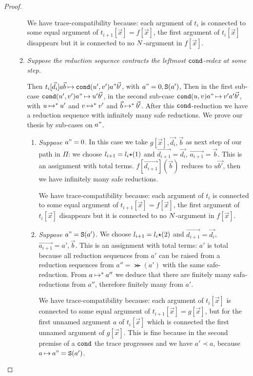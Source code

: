 \begin{proof}
\begin{enumerate}
\begin{enumerate}
  We have trace-compatibility because: 
  each argument of $t_i$ is connected to some equal argument of $t_{i+1}[\vec{x}]=f[\vec{x}]$,
  the first argument of $t_i[\vec{x}]$ disappears but it is connected to no ${N}$-argument in $f[\vec{x}]$.

\item
  \emph{Suppose the reduction sequence contracts the leftmost ${\tt cond}$-redex at some step.}

  Then $t_i[\vec{d_i}]a \vec{b} \mathbin{\mapsto} {\tt cond}(u',v')a"\vec{b'}$, with $a"=0, {\tt S}(a')$,
  Then  in the first sub-case ${\tt cond}(u',v')a" \mathbin{\mapsto} u' \vec{b'}$, in the second sub-case
  ${\tt cond}(u,v)a" \mathbin{\mapsto} v' a' \vec{b'}$, 
  with $u \mathbin{\mapsto}^* u'$ and $v \mathbin{\mapsto}^* v'$ and $\vec{b} \mathbin{\mapsto}^* \vec{b'}$.
  After this ${\tt cond}$-reduction we have a reduction sequence with infinitely many safe reductions.
  We prove our thesis by sub-cases on $a"$.
   

\begin{enumerate}
\item
  \emph{Suppose $a" = 0$}.
   In this case we take $g[\vec{x}],\vec{d_i},\vec{b}$ as next step of our path in $\Pi$:
  we choose $l_{i+1} = l_i {\star} (1)$ and $\vec{d_{i+1}} = \vec{d_i}$,
  $\vec{a_{i+1}} = \vec{b}$. This is an assignment with total terms.
  $f[\vec{d_{i+1}}](\vec{b})$ reduces to $u \vec{b'}$, then we have infinitely many safe reductions.

  We have trace-compatibility because: 
    each argument of $t_i$ is connected to some equal argument of $t_{i+1}[\vec{x}]=f[\vec{x}]$,
    the first argument of $t_i[\vec{x}]$ disappears but it is connected to no ${N}$-argument in $f[\vec{x}]$.

 \item
  \emph{Suppose $a" = {\tt S}(a')$}. 
  We choose $l_{i+1} = l_i {\star} (2)$ and $\vec{d_{i+1}} = \vec{d_i}$,
  $\vec{a_{i+1}} = a',\vec{b}$. This is an assignment with total terms: $a'$ is total because
  all reduction sequences from $a'$ can be raised from a reduction sequences from $a'' = \Succ(a')$
  with the same safe-reduction. From $a \mathbin{\mapsto}^* a''$ we deduce that
  there are finitely many safa-reductions from $a''$, therefore finitely many from $a'$.
 
  We have trace-compatibility because: 
  each argument of $t_i[\vec{x}]$ is connected to some equal argument of 
    $t_{i+1}[\vec{x}]=g[\vec{x}]$,
    but for the first unnamed argument $a$ of $t_i[\vec{x}]$ 
    which is connected the first unnamed argument of $g[\vec{x}]$.
    This is fine because in the second premise of a ${\tt cond}$ 
    the trace progresses and we have $a' \prec a$, because $a \mathbin{\mapsto}  a" = {\tt S}(a')$.


\end{enumerate}
\end{enumerate}
\end{enumerate}
\end{proof}
